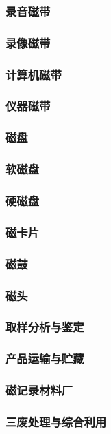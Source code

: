 \documentclass[UTF8]{../../ApplicationUniverse}
\begin{document}
        \subsubsection{录音磁带}
        \subsubsection{录像磁带}
        \subsubsection{计算机磁带}
        \subsubsection{仪器磁带}
    \subsubsection{磁盘}
        \subsubsection{软磁盘}
        \subsubsection{硬磁盘}
    \subsubsection{磁卡片}
    \subsubsection{磁鼓}
    \subsubsection{磁头}
    \subsubsection{取样分析与鉴定}
    \subsubsection{产品运输与贮藏}
\subsubsection{磁记录材料厂}
\subsubsection{三废处理与综合利用}
\end{document}

